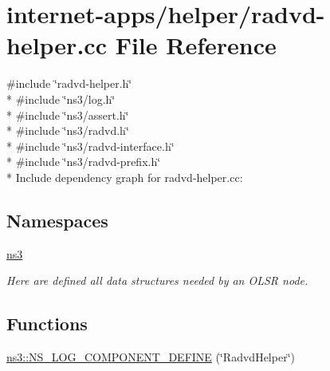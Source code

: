 \hypertarget{radvd-helper_8cc}{}\section{internet-\/apps/helper/radvd-\/helper.cc File Reference}
\label{radvd-helper_8cc}
{\ttfamily \#include \char`\"{}radvd-\/helper.\+h\char`\"{}}\\*
{\ttfamily \#include \char`\"{}ns3/log.\+h\char`\"{}}\\*
{\ttfamily \#include \char`\"{}ns3/assert.\+h\char`\"{}}\\*
{\ttfamily \#include \char`\"{}ns3/radvd.\+h\char`\"{}}\\*
{\ttfamily \#include \char`\"{}ns3/radvd-\/interface.\+h\char`\"{}}\\*
{\ttfamily \#include \char`\"{}ns3/radvd-\/prefix.\+h\char`\"{}}\\*
Include dependency graph for radvd-\/helper.cc\+:
\subsection*{Namespaces}
\begin{DoxyCompactItemize}
\item 
 \hyperlink{namespacens3}{ns3}
\begin{DoxyCompactList}\small\item\em Here are defined all data structures needed by an O\+L\+SR node. \end{DoxyCompactList}\end{DoxyCompactItemize}
\subsection*{Functions}
\begin{DoxyCompactItemize}
\item 
\hyperlink{namespacens3_a44d29bce7fbabaaecc75772416262e2f}{ns3\+::\+N\+S\+\_\+\+L\+O\+G\+\_\+\+C\+O\+M\+P\+O\+N\+E\+N\+T\+\_\+\+D\+E\+F\+I\+NE} (\char`\"{}Radvd\+Helper\char`\"{})
\end{DoxyCompactItemize}

